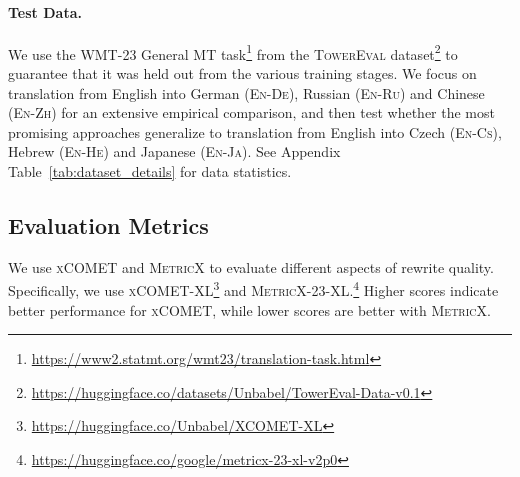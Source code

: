 \paragraph{Test Data.}
We use the WMT-23 General MT task\footnote{\url{https://www2.statmt.org/wmt23/translation-task.html}} from the \textsc{TowerEval} dataset\footnote{\url{https://huggingface.co/datasets/Unbabel/TowerEval-Data-v0.1}} to guarantee that it was held out from the various training stages. We focus on translation from English into German (\textsc{En-De}), Russian (\textsc{En-Ru}) and Chinese (\textsc{En-Zh}) for an extensive empirical comparison, and then test whether the most promising approaches generalize to translation from English into Czech (\textsc{En-Cs}), Hebrew (\textsc{En-He}) and Japanese (\textsc{En-Ja}). %
See Appendix Table~\ref{tab:dataset_details} for data statistics.



\subsection{Evaluation Metrics}
We use \textsc{xCOMET} \citep{guerreiro2023xcomet} and \textsc{MetricX} \citep{juraska-etal-2023-metricx} to evaluate different aspects of rewrite quality. Specifically, we use \textsc{xCOMET-XL}\footnote{\url{https://huggingface.co/Unbabel/XCOMET-XL}} and \textsc{MetricX-23-XL}.\footnote{\url{https://huggingface.co/google/metricx-23-xl-v2p0}} Higher scores indicate better performance for \textsc{xCOMET}, while lower scores are better with \textsc{MetricX}.


